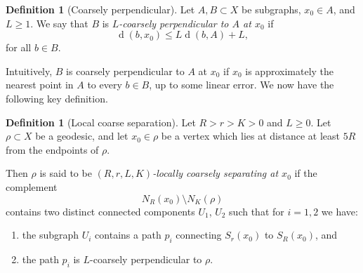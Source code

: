 \documentclass[10pt,a4paper]{amsart}
\DeclareMathOperator{\dist}{d}
\theoremstyle{definition}
\newtheorem{definition}[theorem]{Definition}
\begin{document}
\begin{definition}[Coarsely perpendicular]
    Let $A, B \subset X$ be  subgraphs, $x_0 \in A$, and $L \geq 1$. We say that $B$ is \textit{$L$-coarsely perpendicular to $A$ at $x_0$} if 
    $$
    \dist(b,x_0) \leq L \dist(b, A) + L,
    $$
    for all $b \in B$. 
\end{definition}

Intuitively, $B$ is coarsely perpendicular to $A$ at $x_0$ if $x_0$ is approximately the nearest point in $A$ to every $b \in B$, up to some linear error.
We now have the following key definition. 

\begin{definition}[Local coarse separation]
    Let $R >  r > K > 0$ and $L \geq 0$. Let $\rho \subset X$ be a geodesic, and let $x_0 \in \rho$ be a vertex which lies at distance at least $5R$ from the endpoints of $\rho$. 
    
    Then $\rho$ is said to be \textit{$(R, r, L, K)$-locally coarsely separating at $x_0$} if the complement
    $$
    N_{R}(x_0) \setminus N_K(\rho)
    $$
    contains two distinct connected components $U_1$, $U_2$ such that for $i =1,2$ we have:
    \begin{enumerate}
        \item the subgraph $U_i$ contains a path $p_i$ connecting $S_r(x_0)$ to $S_R(x_0)$, and 

        \item  the path $p_i$ is $L$-coarsely perpendicular to $\rho$.  
    \end{enumerate}
\end{definition}
\end{document}

